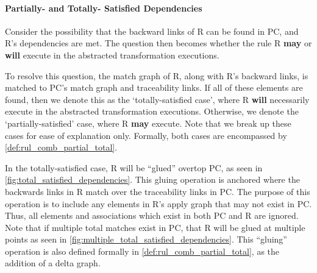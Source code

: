 \paragraph{Partially- and Totally- Satisfied Dependencies}

Consider the possibility that the backward links of R can be found in PC, and R's dependencies are met. The question then becomes whether the rule R \textbf{may} or \textbf{will} execute in the abstracted transformation executions.

To resolve this question, the match graph of R, along with R's backward links, is matched to PC's match graph and traceability links. If all of these elements are found, then we denote this as the `totally-satisfied case', where R \textbf{will} necessarily execute in the abstracted transformation executions. Otherwise, we denote the `partially-satisfied' case, where R \textbf{may} execute. Note that we break up these cases for ease of explanation only. Formally, both cases are encompassed by \cref{def:rul_comb_partial_total}.

In the totally-satisfied case, R will be ``glued'' overtop PC, as seen in \cref{fig:total_satisfied_dependencies}. This gluing operation is anchored where the backwards links in R match over the traceability links in PC. The purpose of this operation is to include any elements in R's apply graph that may not exist in PC. Thus, all elements and associations which exist in both PC and R are ignored. Note that if multiple total matches exist in PC, that R will be glued at multiple points as seen in \cref{fig:multiple_total_satisfied_dependencies}. This ``gluing'' operation is also defined formally in \cref{def:rul_comb_partial_total}, as the addition of a delta graph.

